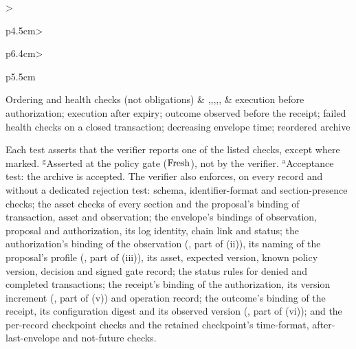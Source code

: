 \begin{table}[!t]
\begin{tabular}{>{\raggedright\arraybackslash}p{4.5cm}>{\raggedright\arraybackslash}p{6.4cm}>{\raggedright\arraybackslash}p{5.5cm}}
\midrule
Ordering and health checks (not obligations) & ,\newline {},\newline {},\newline {},\newline {},\newline {} & execution before authorization; execution after expiry; outcome observed before the receipt; failed health checks on a closed transaction; decreasing envelope time; reordered archive \\
\bottomrule
\end{tabular}
\par\smallskip\parbox{\linewidth}{\footnotesize\raggedright Each test asserts that the verifier reports one of the listed checks, except where marked. $^{\mathrm{g}}$Asserted at the policy gate ($\mathrm{Fresh}$), not by the verifier. $^{\mathrm{a}}$Acceptance test: the archive is accepted. The verifier also enforces, on every record and without a dedicated rejection test: schema, identifier-format and section-presence checks; the asset checks of every section and the proposal's binding of transaction, asset and observation; the envelope's bindings of observation, proposal and authorization, its log identity, chain link and status; the authorization's binding of the observation (, part of (ii)), its naming of the proposal's profile (, part of (iii)), its asset, expected version, known policy version, decision and signed gate record; the status rules for denied and completed transactions; the receipt's binding of the authorization, its version increment (, part of (v)) and operation record; the outcome's binding of the receipt, its configuration digest and its observed version (, part of (vi)); and the per-record checkpoint checks and the retained checkpoint's time-format, after-last-envelope and not-future checks.}
\end{table}
